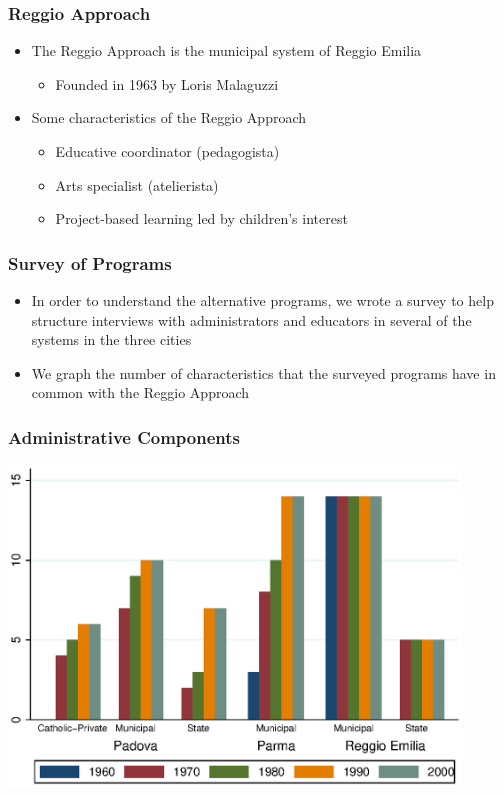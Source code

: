 \documentclass[dynamic]{JJH-Beamer}
\begin{document}
\begin{frame}
\frametitle{Reggio Approach}
\begin{itemize}
	\item The Reggio Approach is the municipal system of Reggio Emilia
	\begin{itemize}
		\item Founded in 1963 by Loris Malaguzzi
	\end{itemize}
	\item Some characteristics of the Reggio Approach
	\begin{itemize}
		\item Educative coordinator (pedagogista)
		\item Arts specialist (atelierista)
		\item Project-based learning led by children's interest 
	\end{itemize}
\end{itemize}
\end{frame}


\begin{frame}
\frametitle{Survey of Programs}
\begin{itemize}
	\item In order to understand the alternative programs, we wrote a survey to help structure interviews with administrators and educators in several of the systems in the three cities
	\item We graph the number of characteristics that the surveyed programs have in common with the Reggio Approach
\end{itemize}
\end{frame}

\begin{frame}
\frametitle{Administrative Components}
\includegraphics[width=0.9\textwidth]{../../output/aggregateAdministrative.eps}
\end{frame}
\end{document}
